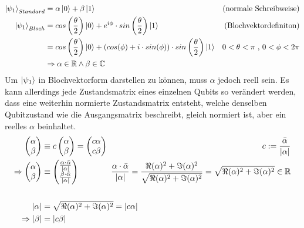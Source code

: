 \documentclass[12pt]{report}
\begin{document}
	\begin{align*}
		\ket{\psi_{1}}_{Standard} &= \alpha\ket{0} + \beta\ket{1} & \text{(normale Schreibweise)}\\
		\ket{\psi_{1}}_{Bloch} &= cos\left(\frac{\theta}{2}\right)\ket{0} + e^{i\phi}\cdot sin\left(\frac{\theta}{2}\right)\ket{1} & \text{(Blochvektordefiniton)} \\
		&= cos\left(\frac{\theta}{2}\right)\ket{0} +\left( cos(\phi)+i\cdot sin(\phi) \right)\cdot sin\left(\frac{\theta}{2}\right)\ket{1} & 0 < \theta < \pi\text{ , }0 < \phi < 2 \pi\\
		&\Rightarrow \alpha \in \mathbb{R} \wedge \beta \in \mathbb{C}
	\end{align*}
Um $\ket{\psi_{1}}$ in Blochvektorform darstellen zu können, muss $\alpha$ jedoch reell sein. Es kann allerdings jede Zustandsmatrix eines einzelnen Qubits so verändert werden, dass eine weiterhin normierte Zustandsmatrix entsteht, welche denselben Qubitzustand wie die Ausgangsmatrix beschreibt, gleich normiert ist, aber ein reelles $\alpha$ beinhaltet.
\\
	\begin{align*}
		 \begin{pmatrix}\alpha\\ \beta\end{pmatrix} &\equiv
		c\begin{pmatrix}\alpha\\ \beta\end{pmatrix} = \begin{pmatrix}c\alpha\\ c\beta\end{pmatrix} & c := \frac{\bar{\alpha}}{\vert \alpha \vert}\\
		\Rightarrow\begin{pmatrix}\alpha\\ \beta\end{pmatrix} &\equiv
		\begin{pmatrix}\frac{\alpha\cdot\bar\alpha}{\vert\alpha\vert}\\ \frac{\beta\cdot\bar\alpha}{\vert\alpha\vert}\end{pmatrix} &
		\hspace{-1.5cm}\frac{\alpha\cdot\bar\alpha}{\vert\alpha\vert} = \frac{\Re(\alpha)^2+\Im(\alpha)^2}{\sqrt{\Re(\alpha)^2+\Im(\alpha)^2}} = \sqrt{\Re(\alpha)^2+\Im(\alpha)^2} \in \mathbb{R}\\
		\\
		 \vert\alpha\vert &= \sqrt{\Re(\alpha)^2+\Im(\alpha)^2} = \vert c\alpha\vert \\ \Rightarrow \vert \beta \vert &= \vert c \beta \vert
	\end{align*}
\end{document}
